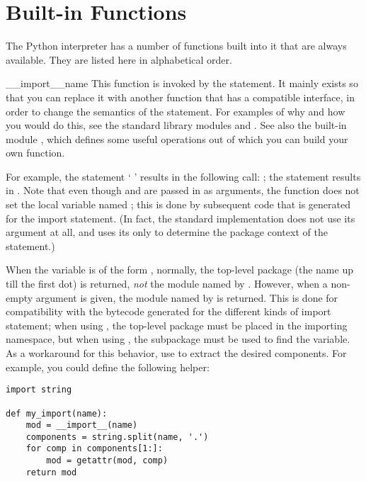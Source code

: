 \section{Built-in Functions \label{built-in-funcs}}

The Python interpreter has a number of functions built into it that
are always available.  They are listed here in alphabetical order.



\begin{funcdesc}{__import__}{name}
This function is invoked by the  statement.  It
mainly exists so that you can replace it with another
function that has a compatible interface, in order to change the
semantics of the  statement.  For examples of why and
how you would do this, see the standard library modules
 and .  See also the built-in module
, which defines some useful operations out of which you can
build your own  function.

For example, the statement ` ' results in the
following call:
  ;
the statement    results
in   
\code{['eggs'])}.
Note that even though  and \code{['eggs']} are passed
in as arguments, the  function does not set the
local variable named ; this is done by subsequent code that
is generated for the import statement.  (In fact, the standard
implementation does not use its  argument at all, and uses
its  only to determine the package context of the
 statement.)

When the  variable is of the form ,
normally, the top-level package (the name up till the first dot) is
returned, \emph{not} the module named by .  However, when a
non-empty  argument is given, the module named by
 is returned.  This is done for compatibility with the
bytecode generated for the different kinds of import statement; when
using , the top-level package 
must be placed in the importing namespace, but when using , the  subpackage must be used to
find the  variable.
As a workaround for this behavior, use  to extract
the desired components.  For example, you could define the following
helper:

\begin{verbatim}
import string

def my_import(name):
    mod = __import__(name)
    components = string.split(name, '.')
    for comp in components[1:]:
        mod = getattr(mod, comp)
    return mod
\end{verbatim}

\end{funcdesc}

